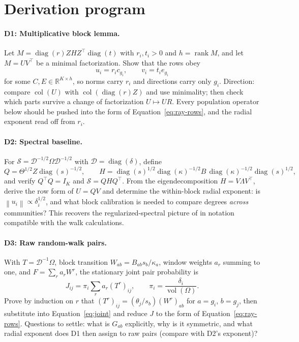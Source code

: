 \documentclass[11pt]{article}
\newcommand{\norm}[1]{\left\lVert#1\right\rVert}
\newcommand{\R}{\mathbb{R}}
\DeclareMathOperator{\vol}{vol}
\DeclareMathOperator{\diag}{diag}
\DeclareMathOperator{\rank}{rank}
\DeclareMathOperator{\col}{col}
\begin{document}
\section{Derivation program}


\paragraph{D1: Multiplicative block lemma.}
Let \(M=\diag(r)ZHZ^\top\diag(t)\) with \(r_i,t_i>0\) and \(h=\rank M\), and let \(M=UV^\top\) be a minimal factorization.
Show that the rows obey
\begin{equation}
    u_i=r_i c_{g_i},
    \qquad
    v_i=t_i e_{g_i}
    \label{eq:ray-rows}
\end{equation}
for some \(C,E\in\R^{K\times h}\), so norms carry \(r_i\) and directions carry only \(g_i\).
Direction: compare \(\col(U)\) with \(\col(\diag(r)Z)\) and use minimality; then check which parts survive a change of factorization \(U\mapsto UR\).
Every population operator below should be pushed into the form of Equation~\eqref{eq:ray-rows}, and the radial exponent read off from \(r_i\).

\paragraph{D2: Spectral baseline.}
For \(\mathcal{S}=\mathcal{D}^{-1/2}\Omega\mathcal{D}^{-1/2}\) with \(\mathcal{D}=\diag(\delta)\), define
\begin{equation}
    Q=\Theta^{1/2}Z\diag(s)^{-1/2},
    \qquad
    H=\diag(s)^{1/2}\diag(\kappa)^{-1/2}B\,\diag(\kappa)^{-1/2}\diag(s)^{1/2},
    \label{eq:QH}
\end{equation}
and verify \(Q^\top Q=I_K\) and \(\mathcal{S}=QHQ^\top\).
From the eigendecomposition \(H=V\Lambda V^\top\), derive the row form of \(U=QV\) and determine the within-block radial exponent: is \(\norm{u_i}\propto\delta_i^{1/2}\), and what block calibration is needed to compare degrees \emph{across} communities?
This recovers the regularized-spectral picture of \citet{qin2013regularized} in notation compatible with the walk calculations.

\paragraph{D3: Raw random-walk pairs.}
With \(T=\mathcal{D}^{-1}\Omega\), block transition \(W_{ab}=B_{ab}s_b/\kappa_a\), window weights \(a_r\) summing to one, and \(F=\sum_r a_r W^r\), the stationary joint pair probability is
\begin{equation}
    J_{ij}=\pi_i\sum_{r} a_r (T^r)_{ij},
    \qquad
    \pi_i=\frac{\delta_i}{\vol(\Omega)}.
    \label{eq:joint}
\end{equation}
Prove by induction on \(r\) that \((T^r)_{ij}=(\theta_j/s_b)(W^r)_{ab}\) for \(a=g_i\), \(b=g_j\), then substitute into Equation~\eqref{eq:joint} and reduce \(J\) to the form of Equation~\eqref{eq:ray-rows}.
Questions to settle: what is \(G_{ab}\) explicitly, why is it symmetric, and what radial exponent does D1 then assign to raw pairs (compare with D2's exponent)?
\end{document}
